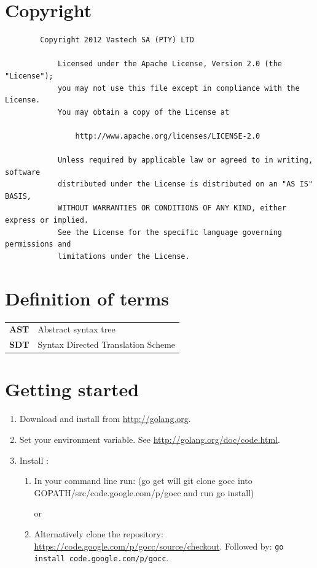 \documentclass[12pt]{article}
\begin{document}
\section{Copyright}
	\begin{verbatim}
		Copyright 2012 Vastech SA (PTY) LTD
		
		    Licensed under the Apache License, Version 2.0 (the "License");
		    you may not use this file except in compliance with the License.
		    You may obtain a copy of the License at
		    
		        http://www.apache.org/licenses/LICENSE-2.0
		    
		    Unless required by applicable law or agreed to in writing, software
		    distributed under the License is distributed on an "AS IS" BASIS,
		    WITHOUT WARRANTIES OR CONDITIONS OF ANY KIND, either express or implied.
		    See the License for the specific language governing permissions and
		    limitations under the License.
	\end{verbatim}



\section{Definition of terms}
	\begin{longtable}{ll}
		\bf AST & Abstract syntax tree\\
		\bf SDT	& Syntax Directed Translation Scheme \\
	\end{longtable}

\section{Getting started}
	\begin{enumerate}
		\item Download and install \Go from \url{http://golang.org}.

		\item Set your  environment variable. See \url{http://golang.org/doc/code.html}.

		\item Install \gocc:
			\begin{enumerate}
				\item In your command line run:  (go get will git clone gocc into GOPATH/src/code.google.com/p/gocc and run go install)

					or 

				\item Alternatively clone the repository: \url{https://code.google.com/p/gocc/source/checkout}. Followed by:
				\verb|go install code.google.com/p/gocc|.
			\end{enumerate}

	\end{enumerate}
\end{document}
